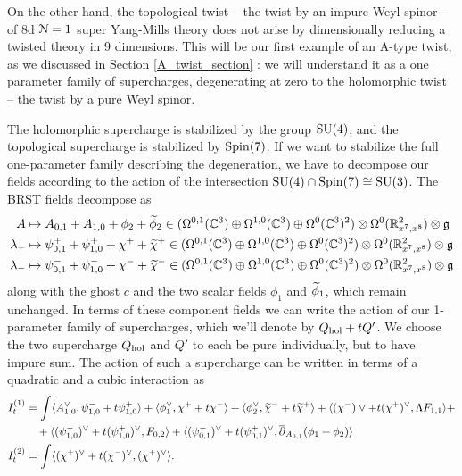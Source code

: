 \documentclass[10pt, oneside]{article}
\begin{document}
On the other hand, the topological twist -- the twist by an impure Weyl spinor -- of 8d $\mathcal{N}=1$ super Yang-Mills theory does not arise by dimensionally reducing a twisted theory in 9 dimensions.  This will be our first example of an A-type twist, as we discussed in Section \ref{A_twist_section} : we will understand it as a one parameter family of supercharges, degenerating at zero to the holomorphic twist -- the twist by a pure Weyl spinor.

The holomorphic supercharge is stabilized by the group $\mathrm{SU}(4)$, and the topological supercharge is stabilized by $\mathrm{Spin}(7)$.  If we want to stabilize the full one-parameter family describing the degeneration, we have to decompose our fields according to the action of the intersection $\mathrm{SU}(4) \cap \mathrm{Spin}(7) \cong \mathrm{SU}(3)$.  The BRST fields decompose as
\begin{align*}
A &\mapsto A_{0,1} + A_{1,0} + \phi_2 + \widetilde{\phi}_2 \in (\Omega^{0,1}(\mathbb C^3) \oplus \Omega^{1,0}(\mathbb C^3) \oplus \Omega^0(\mathbb C^3)^2) \otimes \Omega^0(\mathbb R^2_{x^7,x^8}) \otimes \mathfrak{g}\\
\lambda_+ &\mapsto \psi^+_{0,1} + \psi^+_{1,0} + \chi^+ + \widetilde{\chi}^+ \in (\Omega^{0,1}(\mathbb C^3) \oplus \Omega^{1,0}(\mathbb C^3) \oplus \Omega^0(\mathbb C^3)^2) \otimes \Omega^0(\mathbb R^2_{x^7,x^8}) \otimes \mathfrak{g}\\
\lambda_- &\mapsto \psi^-_{0,1} + \psi^-_{1,0} + \chi^- + \widetilde{\chi}^- \in (\Omega^{0,1}(\mathbb C^3) \oplus \Omega^{1,0}(\mathbb C^3) \oplus \Omega^0(\mathbb C^3)^2) \otimes \Omega^0(\mathbb R^2_{x^7,x^8}) \otimes \mathfrak{g}
\end{align*}
along with the ghost $c$ and the two scalar fields $\phi_1$ and $\widetilde{\phi}_1$, which remain unchanged.  In terms of these component fields we can write the action of our 1-parameter family of supercharges, which we'll denote by $Q_{\mathrm{hol}} + tQ'$.  We choose the two supercharge $Q_{\mathrm{hol}}$ and $Q'$ to each be pure individually, but to have impure sum.  The action of such a supercharge can be written in terms of a quadratic and a cubic interaction as
\begin{align*}
I^{(1)}_t &= \int \langle A_{1,0}^\vee, \psi_{1,0}^- + t\psi_{1,0}^+\rangle + \langle \phi_1^\vee, \chi^+ + t\chi^- \rangle + \langle \phi_2^\vee, \widetilde{\chi}^- + t\widetilde{\chi}^+ \rangle + \langle (\chi^-)\vee + t(\chi^+)^\vee, \Lambda F_{1,1} \rangle + \\
&\quad + \langle (\psi^-_{1,0})^\vee + t(\psi^+_{1,0})^\vee, F_{0,2} \rangle + \langle (\psi^-_{0,1})^\vee + t(\psi^+_{0,1})^\vee, \overline{\partial}_{A_{0,1}} (\phi_1 + \phi_2) \rangle \\
I^{(2)}_t &= \int \langle (\chi^+)^\vee + t(\chi^-)^\vee, (\chi^+)^\vee \rangle.
\end{align*}
\end{document}
